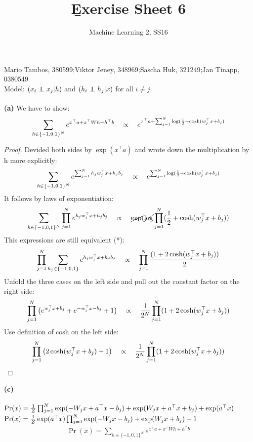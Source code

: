 \documentclass[a4paper]{article}
\newcommand\indep{\protect\mathpalette{\protect\indeP}{\perp}}
\def\indeP#1#2{\mathrel{\rlap{$#1#2$}\mkern2mu{#1#2}}}
\newcommand{\hto}{{h^\top}}
\newcommand{\xt}{{x^\top}}
\newcommand{\1}{\mathds{1}}
\begin{document}
\title{\b{Exercise Sheet 6}}
\author{Machine Learning 2, SS16}

\maketitle

Mario Tambos, 380599;\quad Viktor Jeney, 348969;\quad Sascha Huk, 321249;\quad Jan Tinapp, 0380549\\


Model: $(x_i \indep x_j | h)$ 
and $(h_i \indep h_j | x)$ for all $i\neq j$.  
\\
\\
\textbf{(a)} We have to show:
\begin{gather*}
	\sum_{h\in\{-1,0,1\}^N} e^{\xt a + \xt Wh + \hto b }
	\quad \propto \quad
	e^{\xt a + \sum_{j=1}^N \log({1\over 2} + \cosh(w^\top_j x + b_j)}  
\end{gather*}
\begin{proof}
Devided both sides by $\exp(x^\top a)$ and wrote down the multiplication by h more explicitly:
\begin{gather*}
	\sum_{h\in\{-1,0,1\}^N} e^{\sum_{j=1}^N h_j w_j^\top x + h_j b_j }
	\quad \propto \quad
	e^{\sum_{j=1}^N \log({1\over 2} + \cosh(w^\top_j x + b_j)}  
\end{gather*}
It follows by laws of exponentiation: 
\begin{gather*}
	\sum_{h\in\{-1,0,1\}^N} \prod_{j=1}^N e^{ h_j w_j^\top x + h_j b_j }
	\quad \propto \quad
	\cancel{\exp}(\cancel{\log}\prod_{j=1}^N ({1\over 2} + \cosh(w^\top_j x + b_j))  
\end{gather*} 
This expressions are still equivalent (*):
\begin{gather*}
	\prod_{j=1}^N \sum_{h_j\in\{-1,0,1\}} e^{ h_j w_j^\top x + h_j b_j }
	\quad \propto \quad
	\prod_{j=1}^N {(1 + 2\cosh(w^\top_j x + b_j) ) \over 2} 
\end{gather*}
Unfold the three cases on the left side and pull out the constant factor on the right side:
\begin{gather*}
	\prod_{j=1}^N \big( e^{w_j^\top x + b_j}  +  e^{-w_j^\top x - b_j}   +  1  \big)
	\quad \propto \quad
	{1 \over 2^N}\prod_{j=1}^N (1 + 2\cosh(w^\top_j x + b_j)  )
\end{gather*}
Use definition of cosh on the left side:
\begin{gather*}
	\prod_{j=1}^N \big( 2\cosh(w^\top_j x + b_j)   +  1  \big)
	\quad \propto \quad
	{1 \over 2^N}\prod_{j=1}^N (1 + 2\cosh(w^\top_j x + b_j)  )
\end{gather*}
\end{proof}
\newpage
\textbf{(c)} \\
\\
$\Pr(x) = {1 \over Z}\prod_{j=1}^N \exp(-W_jx+a^\top x - b_j) + \exp(W_jx + a^\top x + b_j) + \exp(a^\top x)$
\\
$\Pr(x) = {1 \over Z}\exp(a^\top x)\prod_{j=1}^N \exp(-W_jx - b_j) + \exp(W_jx + b_j) + 1$
\begin{gather*}
	\Pr(x) = \sum_{h\in\{-1,0,1\}^N} e^{\xt a + \xt Wh + \hto b }
\end{gather*}
\end{document}
